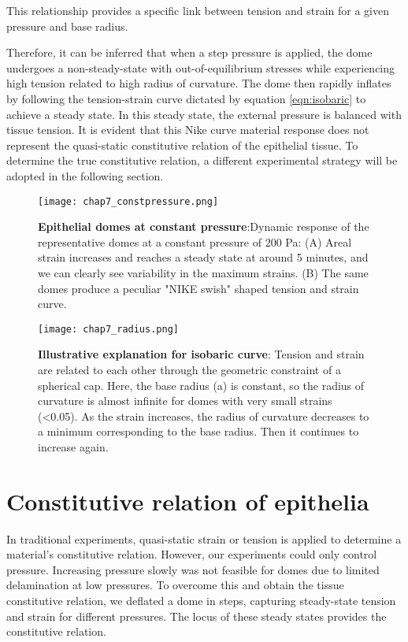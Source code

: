 This relationship provides a specific link between tension and strain for a given pressure and base radius. 

Therefore, it can be inferred that when a step pressure is applied, the dome undergoes a non-steady-state with out-of-equilibrium stresses while experiencing high tension related to high radius of curvature. The dome then rapidly inflates by following the tension-strain curve dictated by equation \ref{eqn:isobaric} to achieve a steady state. In this steady state, the external pressure is balanced with tissue tension. It is evident that this Nike curve material response does not represent the quasi-static constitutive relation of the epithelial tissue. To determine the true constitutive relation, a different experimental strategy will be adopted in the following section.

\begin{figure}[t]
	\centering
	\texttt{[image: chap7\_constpressure.png]}
	\caption{\label{fig_7_3} \textbf{Epithelial domes at constant pressure}:Dynamic response of the representative domes at a constant pressure of 200 Pa: (A) Areal strain increases and reaches a steady state at around 5 minutes, and we can clearly see variability in the maximum strains. (B) The same domes produce a peculiar "NIKE swish" shaped tension and strain curve.
	}
\end{figure}

\begin{figure}
	\centering
	\texttt{[image: chap7\_radius.png]}
	\caption{\label{fig_7_4} \textbf{Illustrative explanation for isobaric curve}: Tension and strain are related to each other through the geometric constraint of a spherical cap. Here, the base radius (a) is constant, so the radius of curvature is almost infinite for domes with very small strains (<0.05). As the strain increases, the radius of curvature decreases to a minimum corresponding to the base radius. Then it continues to increase again.	
	}
\end{figure}

\hypertarget{constitutive-relation-of-epithelia}{%
	\section{Constitutive relation of
		epithelia}\label{constitutive-relation-of-epithelia}}

In traditional experiments, quasi-static strain or tension is applied to determine a material's constitutive relation. However, our experiments could only control pressure. Increasing pressure slowly was not feasible for domes due to limited delamination at low pressures. To overcome this and obtain the tissue constitutive relation, we deflated a dome in steps, capturing steady-state tension and strain for different pressures. The locus of these steady states provides the constitutive relation.

